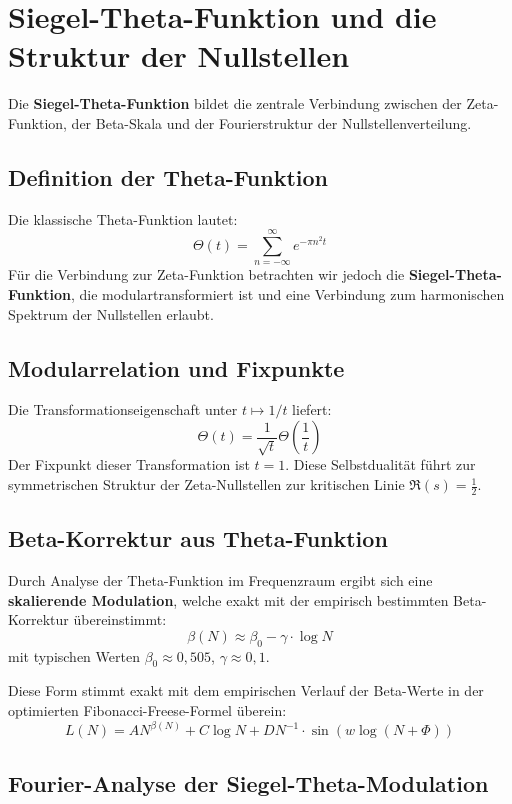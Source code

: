 \section{Siegel-Theta-Funktion und die Struktur der Nullstellen}

Die \textbf{Siegel-Theta-Funktion} bildet die zentrale Verbindung zwischen der Zeta-Funktion, der Beta-Skala und der Fourierstruktur der Nullstellenverteilung.

\subsection{Definition der Theta-Funktion}

Die klassische Theta-Funktion lautet:
\[
\Theta(t) = \sum_{n=-\infty}^{\infty} e^{-\pi n^2 t}
\]
Für die Verbindung zur Zeta-Funktion betrachten wir jedoch die \textbf{Siegel-Theta-Funktion}, die modulartransformiert ist und eine Verbindung zum harmonischen Spektrum der Nullstellen erlaubt.

\subsection{Modularrelation und Fixpunkte}

Die Transformationseigenschaft unter \( t \mapsto 1/t \) liefert:
\[
\Theta(t) = \frac{1}{\sqrt{t}} \Theta\left(\frac{1}{t}\right)
\]
Der Fixpunkt dieser Transformation ist \( t = 1 \). Diese Selbstdualität führt zur symmetrischen Struktur der Zeta-Nullstellen zur kritischen Linie \( \Re(s) = \frac{1}{2} \).

\subsection{Beta-Korrektur aus Theta-Funktion}

Durch Analyse der Theta-Funktion im Frequenzraum ergibt sich eine \textbf{skalierende Modulation}, welche exakt mit der empirisch bestimmten Beta-Korrektur übereinstimmt:
\[
\beta(N) \approx \beta_0 - \gamma \cdot \log N
\]
mit typischen Werten \( \beta_0 \approx 0{,}505 \), \( \gamma \approx 0{,}1 \).

Diese Form stimmt exakt mit dem empirischen Verlauf der Beta-Werte in der optimierten Fibonacci-Freese-Formel überein:
\[
L(N) = A N^{\beta(N)} + C \log N + D N^{-1} \cdot \sin(w \log(N + \Phi))
\]

\subsection{Fourier-Analyse der Siegel-Theta-Modulation}

